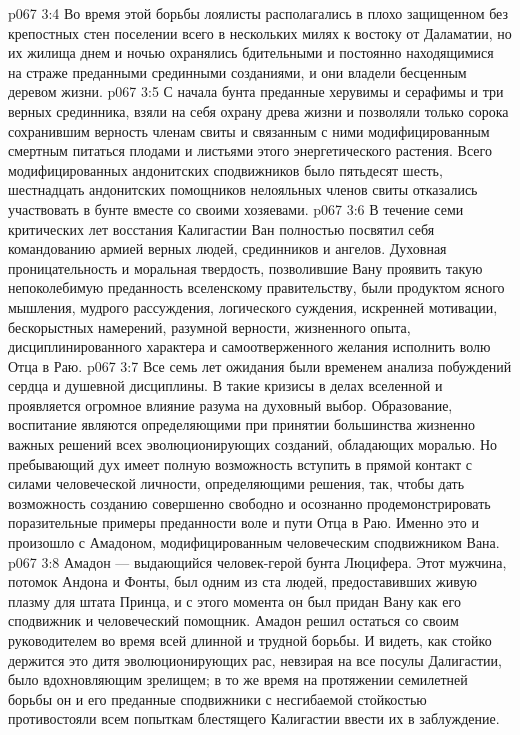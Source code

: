 \vs p067 3:4 Во время этой борьбы лоялисты располагались в плохо защищенном без крепостных стен поселении всего в нескольких милях к востоку от Даламатии, но их жилища днем и ночью охранялись бдительными и постоянно находящимися на страже преданными срединными созданиями, и они владели бесценным деревом жизни.
\vs p067 3:5 С начала бунта преданные херувимы и серафимы и три верных срединника, взяли на себя охрану древа жизни и позволяли только сорока сохранившим верность членам свиты и связанным с ними модифицированным смертным питаться плодами и листьями этого энергетического растения. Всего модифицированных андонитских сподвижников было пятьдесят шесть, шестнадцать андонитских помощников нелояльных членов свиты отказались участвовать в бунте вместе со своими хозяевами.
\vs p067 3:6 \pc В течение семи критических лет восстания Калигастии Ван полностью посвятил себя командованию армией верных людей, срединников и ангелов. Духовная проницательность и моральная твердость, позволившие Вану проявить такую непоколебимую преданность вселенскому правительству, были продуктом ясного мышления, мудрого рассуждения, логического суждения, искренней мотивации, бескорыстных намерений, разумной верности, жизненного опыта, дисциплинированного характера и самоотверженного желания исполнить волю Отца в Раю.
\vs p067 3:7 Все семь лет ожидания были временем анализа побуждений сердца и душевной дисциплины. В такие кризисы в делах вселенной и проявляется огромное влияние разума на духовный выбор. Образование, воспитание являются определяющими при принятии большинства жизненно важных решений всех эволюционирующих созданий, обладающих моралью. Но пребывающий дух имеет полную возможность вступить в прямой контакт с силами человеческой личности, определяющими решения, так, чтобы дать возможность созданию совершенно свободно и осознанно продемонстрировать поразительные примеры преданности воле и пути Отца в Раю. Именно это и произошло с Амадоном, модифицированным человеческим сподвижником Вана.
\vs p067 3:8 Амадон --- выдающийся человек\hyp{}герой бунта Люцифера. Этот мужчина, потомок Андона и Фонты, был одним из ста людей, предоставивших живую плазму для штата Принца, и с этого момента он был придан Вану как его сподвижник и человеческий помощник. Амадон решил остаться со своим руководителем во время всей длинной и трудной борьбы. И видеть, как стойко держится это дитя эволюционирующих рас, невзирая на все посулы Далигастии, было вдохновляющим зрелищем; в то же время на протяжении семилетней борьбы он и его преданные сподвижники с несгибаемой стойкостью противостояли всем попыткам блестящего Калигастии ввести их в заблуждение.
